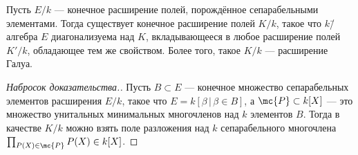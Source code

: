 \documentclass[
	extrafontsizes,
	11pt,
	hyphens,
]{memoir}
\begin{document}

%


\begin{theorem}
Пусть \(E/k\) --- конечное расширение полей, порождённое сепарабельными элементами.
Тогда существует конечное расширение полей \(K/k\), такое что \(k\)\=/алгебра \(E\) диагонализуема над \(K\), вкладывающееся в любое расширение полей \(K'/k\), обладающее тем же свойством.
Более того, такое \(K/k\) --- расширение Галуа.
\end{theorem}

\begin{proof}[Набросок доказательства.]
Пусть \(B \subset E\) --- конечное множество сепарабельных элементов расширения \(E/k\), такое что \(E = k[\beta \,|\, \beta \in B]\),
а \(\mc{P} \subset k[X]\) --- это множество унитальных минимальных многочленов над \(k\) элементов \(B\).
Тогда в качестве \(K/k\) можно взять поле разложения над \(k\) сепарабельного многочлена \(\prod_{P(X) \in \mc{P}} P(X) \in k[X]\).
\end{proof}
\end{document}
